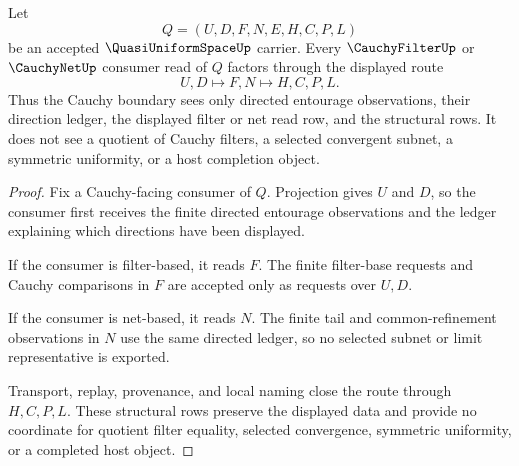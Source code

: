 \begin{theorem}
\label{thm:quasi-uniform-space-cauchy-filter-boundary}
Let
$$
Q=(U,D,F,N,E,H,C,P,L)
$$
be an accepted $\QuasiUniformSpaceUp$ carrier. Every $\CauchyFilterUp$ or $\CauchyNetUp$ consumer read of $Q$ factors through the displayed route
$$
U,D \longmapsto F,N \longmapsto H,C,P,L .
$$
Thus the Cauchy boundary sees only directed entourage observations, their direction ledger, the displayed filter or net read row, and the structural rows. It does not see a quotient of Cauchy filters, a selected convergent subnet, a symmetric uniformity, or a host completion object.
\end{theorem}
\begin{proof}
Fix a Cauchy-facing consumer of $Q$. Projection gives $U$ and $D$, so the consumer first receives the finite directed entourage observations and the ledger explaining which directions have been displayed.

If the consumer is filter-based, it reads $F$. The finite filter-base requests and Cauchy comparisons in $F$ are accepted only as requests over $U,D$.

If the consumer is net-based, it reads $N$. The finite tail and common-refinement observations in $N$ use the same directed ledger, so no selected subnet or limit representative is exported.

Transport, replay, provenance, and local naming close the route through $H,C,P,L$. These structural rows preserve the displayed data and provide no coordinate for quotient filter equality, selected convergence, symmetric uniformity, or a completed host object.
\end{proof}

